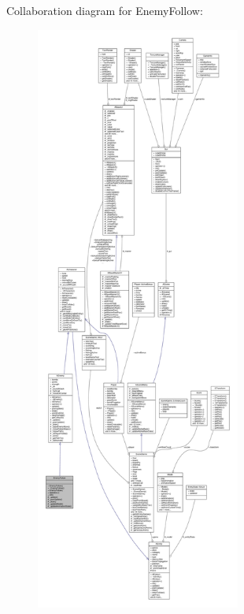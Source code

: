 Collaboration diagram for Enemy\+Follow\+:
\nopagebreak
\begin{figure}[H]
\begin{center}
\leavevmode
\includegraphics[height=550pt]{class_enemy_follow__coll__graph}
\end{center}
\end{figure}
